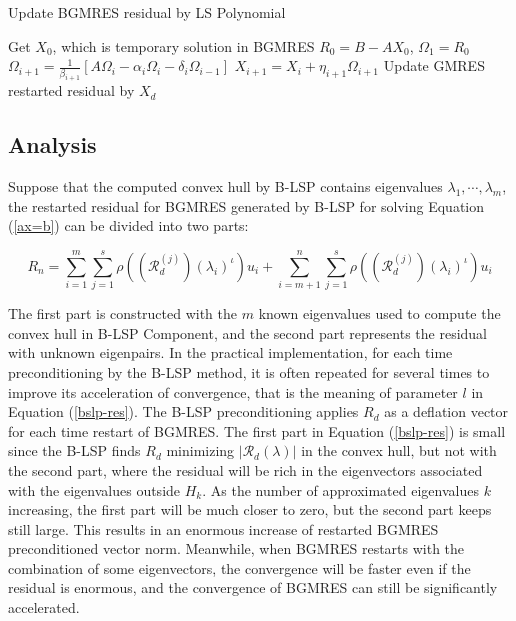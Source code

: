 \begin{algorithm}[htbp]{}
	\caption{Update BGMRES residual by LS Polynomial}   
	\label{alg:LSUpdateResidual}   
	\begin{algorithmic}[1]
		\State Get $X_0$, which is temporary solution in BGMRES
		\State $R_0=B-AX_0$, $\Omega_1 = R_0$
		\State $\Omega_{i+1}=\frac{1}{\beta_{i+1}}[A\Omega_i-\alpha_i\Omega_i-\delta_i\Omega_{i-1}]$
		\State $X_{i+1}=X_i+\eta_{i+1}\Omega_{i+1}$
		\EndFor
		\EndFor
		\State Update GMRES restarted residual by $X_{d}$
		\EndFunction
	\end{algorithmic}  
\end{algorithm}

\subsection{Analysis}

Suppose that the computed convex hull by B-LSP contains eigenvalues $\lambda_1,\cdots, \lambda_m$, the restarted residual for BGMRES generated by B-LSP for solving Equation (\ref{ax=b})  can be divided into two parts:

\begin{equation}
\label{bslp-res}
R_n = \sum_{i=1}^{m}\sum_{j=1}^{s}\rho((\mathcal{R}_d^{(j)})(\lambda_i)^{\iota})u_i + \sum_{i=m+1}^{n}\sum_{j=1}^{s}\rho((\mathcal{R}_d^{(j)})(\lambda_i)^{\iota})u_i
\end{equation}


The first part is constructed with the $m$ known eigenvalues used to compute the convex hull in B-LSP Component, and the second part represents the residual with unknown eigenpairs. In the practical implementation, for each time preconditioning by the B-LSP method, it is often repeated for several times to improve its acceleration of convergence, that is the meaning of parameter $l$ in Equation (\ref{bslp-res}). The B-LSP preconditioning applies $R_d$ as a deflation vector for each time restart of BGMRES. The first part in Equation (\ref{bslp-res}) is small since the B-LSP finds $R_d$ minimizing $|\mathcal{R}_d(\lambda)|$ in the convex hull, but not with the second part, where the residual will be rich in the eigenvectors associated with the eigenvalues outside $H_k$. As the number of approximated eigenvalues $k$ increasing, the first part will be much closer to zero, but the second part keeps still large. This results in an enormous increase of restarted BGMRES preconditioned vector norm. Meanwhile, when BGMRES restarts with the combination of some eigenvectors, the convergence will be faster even if the residual is enormous, and the convergence of BGMRES can still be significantly accelerated.

